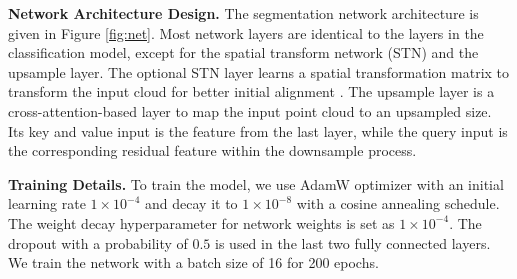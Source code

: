 \documentclass[10pt,twocolumn,letterpaper]{article}
\begin{document}
\textbf{Network Architecture Design.}
The segmentation network architecture is given in Figure \ref{fig:net}.
Most network layers are identical to the layers in the classification model, except for the spatial transform network (STN) and the upsample layer. 
The optional STN layer learns a spatial transformation matrix to transform the input cloud for better initial alignment \cite{Qi2017PointNetDL, Wang2019DynamicGC}. 
The upsample layer is a cross-attention-based layer to map the input point cloud to an upsampled size. Its key and value input is the feature from the last layer, while the query input is the corresponding residual feature within the downsample process.

\textbf{Training Details.}
To train the model, we use AdamW optimizer with an initial
learning rate $1\times 10^{-4}$ and decay it to $1\times 10^{-8}$ with a cosine annealing schedule. The weight decay hyperparameter for network weights is set as $1\times 10^{-4}$. The dropout with a probability of $0.5$ is used in the last two fully connected layers. 
We train the network with a batch size of 16 for 200 epochs.

\begin{table}[t]
\centering
{}
\caption{Segmentation results on ShapeNet Part.}
\label{table:seg}
\end{table}
\end{document}
